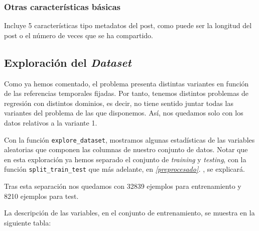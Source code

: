 \documentclass[11pt]{article}
\begin{document}
\subsubsection{Otras características básicas}

Incluye 5 características tipo metadatos del post, como puede ser la longitud del post o el número de veces que se ha compartido.

\subsection{Exploración del \emph{Dataset}} \label{exploracion_datos} \label{boxplot}

Como ya hemos comentado, el problema presenta distintas variantes en función de las referencias temporales fijadas. Por tanto, tenemos distintos problemas de regresión con distintos dominios, es decir, no tiene sentido juntar todas las variantes del problema de las que disponemos. Así, nos quedamos solo con los datos relativos a la variante 1.

Con la función \lstinline{explore_dataset}, mostramos algunas estadísticas de las variables aleatorias que componen las columnas de nuestro conjunto de datos. Notar que en esta exploración ya hemos separado el conjunto de \emph{training} y \emph{testing}, con la función \lstinline{split_train_test} que más adelante, en \emph{\ref{preprocesado}. }, se explicará.

Tras esta separación nos quedamos con 32839 ejemplos para entrenamiento y 8210 ejemplos para test.

La descripción de las variables, en el conjunto de entrenamiento, se muestra en la siguiente tabla:
\end{document}
